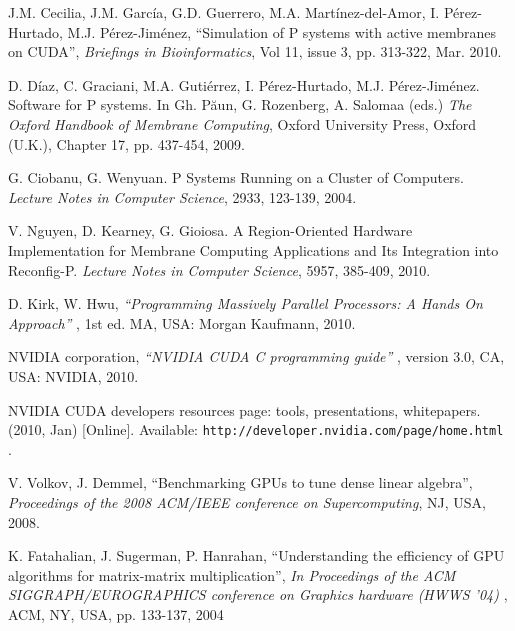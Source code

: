 \documentclass{svmultm}
\begin{document}
\begin{thebibliography}{9999}
{ J.M. Cecilia, J.M. Garc\'{i}a, G.D. Guerrero, M.A. Mart\'{i}nez-del-Amor, I. P\'{e}rez-Hurtado, M.J. P\'{e}rez-Jim\'{e}nez, ``Simulation of P systems with active membranes on CUDA'', {\it Briefings in Bioinformatics}, Vol 11, issue 3, pp. 313-322, Mar. 2010.

 D. D\'{i}az, C. Graciani, M.A. Guti\'{e}rrez, I. P\'{e}rez-Hurtado, M.J. P\'{e}rez-Jim\'{e}nez. Software for P systems. In Gh. P\u{a}un, G. Rozenberg, A. Salomaa (eds.) \textit{The Oxford Handbook of Membrane Computing}, Oxford University Press, Oxford (U.K.), Chapter 17, pp. 437-454, 2009.

 G. Ciobanu, G. Wenyuan. P Systems Running on a Cluster of Computers. \textit{Lecture Notes in Computer Science}, 2933, 123-139, 2004.

 V. Nguyen, D. Kearney, G. Gioiosa. A Region-Oriented Hardware Implementation for Membrane Computing Applications and Its Integration into Reconfig-P. \textit{Lecture Notes in Computer Science}, 5957, 385-409, 2010.

}

 D. Kirk, W. Hwu, {\it ``Programming Massively Parallel Processors: A Hands On Approach'' }, 1st ed. MA, USA: Morgan Kaufmann, 2010.

 NVIDIA corporation, {\it ``NVIDIA CUDA C programming guide'' }, version 3.0, CA, USA: NVIDIA, 2010.

 NVIDIA CUDA developers resources page: tools, presentations, whitepapers. (2010, Jan) [Online]. Available: {\tt http://developer.nvidia.com/page/home.html }.




 V. Volkov, J. Demmel, ``Benchmarking GPUs to tune dense linear algebra'', {\it Proceedings of the 2008 ACM/IEEE conference on Supercomputing}, NJ, USA, 2008.

 K. Fatahalian, J. Sugerman, P. Hanrahan, ``Understanding the efficiency of GPU algorithms for matrix-matrix multiplication'', {\it In Proceedings of the ACM SIGGRAPH/EUROGRAPHICS conference on Graphics hardware (HWWS '04) }, ACM, NY, USA, pp. 133-137, 2004

\end{thebibliography}


%
%


\end{document}
